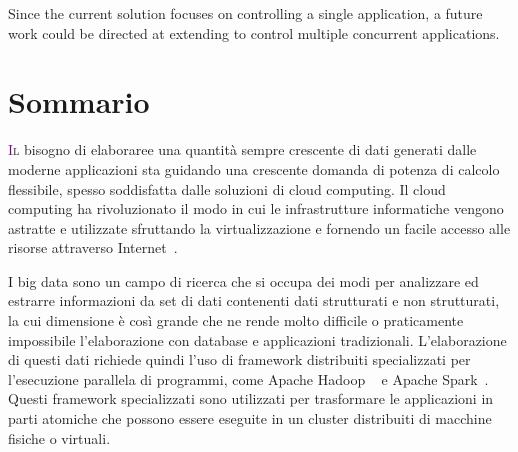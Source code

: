 Since the current solution focuses on controlling a single application, a future work could be directed at extending \tool to control multiple concurrent applications.

\vfill
\newpage
{}
\chapter*{Sommario}
\lettrine[lines=4]{\textcolor{purple}{I}}{l} bisogno di elaboraree una quantità sempre crescente di dati generati dalle moderne applicazioni sta guidando una crescente domanda di potenza di calcolo flessibile, spesso soddisfatta dalle soluzioni di cloud computing. Il cloud computing ha rivoluzionato il modo in cui le infrastrutture informatiche vengono astratte e utilizzate sfruttando la virtualizzazione e fornendo un facile accesso alle risorse attraverso Internet~\cite{articleBigData:2017}.


I big data sono un campo di ricerca che si occupa dei modi per analizzare ed estrarre informazioni da set di dati contenenti dati strutturati e non strutturati, la cui dimensione è così grande che ne rende molto difficile o praticamente impossibile l'elaborazione con database e applicazioni tradizionali. L'elaborazione di questi dati richiede quindi l'uso di framework distribuiti specializzati per l'esecuzione parallela di programmi, come Apache Hadoop ~\cite{misc:ApacheHadoop} e Apache Spark~\cite{misc:ApacheSpark}. Questi framework specializzati sono utilizzati per trasformare le applicazioni in parti atomiche che possono essere eseguite in un cluster distribuiti di macchine fisiche o virtuali.


